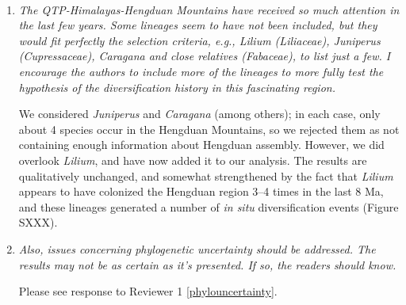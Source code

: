 \documentclass[11pt]{letter}
\begin{document}
\begin{letter}{ \\

}
\begin{enumerate}
  Despite the uncertainty and scarcity of information needed to
  distinguish the Himalayas and QTP proper in terms of plant species
  distributions, we recoded our data set, treating them as separate
  areas (line 184). We scored 210 out of 4,668 species (4.5\%) as
  occurring in the QTP. We then generated new ancestral range
  reconstructions and estimated rates of dispersal and \textit{in
    situ} diversification through time. The results, summarized in
  Figures S3--S5, are virtually identical to the original results with
  respect to Hengduan assembly dynamics.

\item \textit{The QTP-Himalayas-Hengduan Mountains have received so
    much attention in the last few years. Some lineages seem to have
    not been included, but they would fit perfectly the selection
    criteria, e.g., Lilium (Liliaceae), Juniperus (Cupressaceae),
    Caragana and close relatives (Fabaceae), to list just a few. I
    encourage the authors to include more of the lineages to more
    fully test the hypothesis of the diversification history in this
    fascinating region.}

  We considered \textit{Juniperus} and \textit{Caragana} (among
  others); in each case, only about 4 species occur in the Hengduan
  Mountains, so we rejected them as not containing enough information
  about Hengduan assembly. However, we did overlook \textit{Lilium},
  and have now added it to our analysis. The results are qualitatively
  unchanged, and somewhat strengthened by the fact that
  \textit{Lilium} appears to have colonized the Hengduan region 3--4
  times in the last 8 Ma, and these lineages generated a number of
  \textit{in situ} diversification events (Figure SXXX).

\item \textit{Also, issues concerning phylogenetic uncertainty should
    be addressed. The results may not be as certain as it's
    presented. If so, the readers should know.}

  Please see response to Reviewer 1 \ref{phylouncertainty}.

\end{enumerate}





\end{letter}
\end{document}
